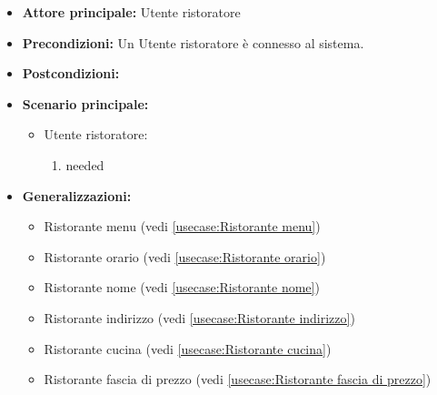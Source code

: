 \label{usecase:Ristorante profilo}
\begin{itemize}
\item \textbf{Attore principale:} Utente ristoratore
\item \textbf{Precondizioni:}
Un Utente ristoratore è connesso al sistema.
\item \textbf{Postcondizioni:}
\item \textbf{Scenario principale:}
\begin{itemize}
\item Utente ristoratore:
\begin{enumerate}
\item needed
\end{enumerate}
\end{itemize}
\item \textbf{Generalizzazioni:}
\begin{itemize}
\item Ristorante menu (vedi \autoref{usecase:Ristorante menu})\item Ristorante orario (vedi \autoref{usecase:Ristorante orario})\item Ristorante nome (vedi \autoref{usecase:Ristorante nome})\item Ristorante indirizzo (vedi \autoref{usecase:Ristorante indirizzo})\item Ristorante cucina (vedi \autoref{usecase:Ristorante cucina})\item Ristorante fascia di prezzo (vedi \autoref{usecase:Ristorante fascia di prezzo})
\end{itemize}
\end{itemize}